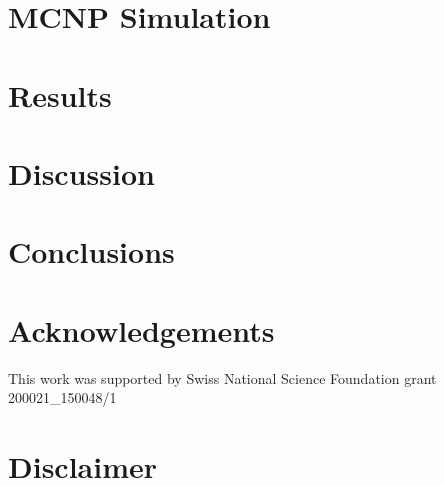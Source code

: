 \documentclass[preprint,12pt]{elsarticle}
\begin{document}
\section{MCNP Simulation}
\label{sec:sim}



\section{Results}
\label{sec:results}



\section{Discussion}
\label{sec:discussion}



\section{Conclusions}
\label{sec:conclusions}



\section*{Acknowledgements}
\label{sec:ack}

This work was supported by Swiss National Science Foundation grant 200021\_150048/1

\section*{Disclaimer}
\label{sec:disc}



\end{document}
